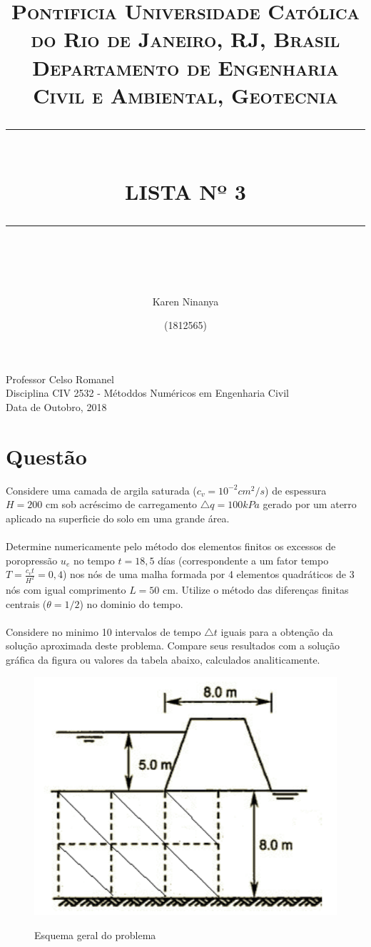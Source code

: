 \documentclass{article} %
\title{
	\normalfont \normalsize 
	\textsc{Pontificia Universidade Católica do Rio de Janeiro, RJ, Brasil \\ 
		Departamento de Engenharia Civil e Ambiental, Geotecnia} \\
	[10pt] 
	\rule{\linewidth}{0.5pt} \\[6pt] 
	\huge LISTA Nº 3\\
	\rule{\linewidth}{2pt}  \\[10pt]
}
\author{Karen Ninanya}
\date{\normalsize (1812565)}
\begin{document}
	
	\maketitle
	\noindent
	Professor \dotfill Celso Romanel\\
	Disciplina \dotfill CIV 2532 - Métoddos Numéricos em Engenharia Civil\\
	Data  de Outobro, 2018 \\
	
	\newpage
	\newpage


\section*{Questão}

\vspace{10mm}
Considere uma camada de argila saturada (\(c_v=10^{-2}cm^2/s\)) de espessura \(H=200\) cm sob acréscimo de carregamento \(\triangle q=100kPa\) gerado por um aterro aplicado na superficie do solo em uma grande área.\\
\\
Determine numericamente pelo método dos elementos finitos os excessos de poropressão \(u_e\) no tempo \(t=18,5 \) días (correspondente a um fator tempo \(T=\frac{c_vt}{H^2}=0,4\)) nos nós de uma malha formada por 4 elementos quadráticos de 3 nós com igual comprimento \(L=50\) cm. Utilize o método das diferenças finitas centrais (\(\theta=1/2\)) no dominio do tempo.\\
\\
Considere no minimo 10 intervalos de tempo \(\triangle t\) iguais para a obtenção da solução aproximada deste problema. Compare seus resultados com a solução gráfica da figura ou valores da tabela abaixo, calculados analiticamente.

\begin{figure}[H]
	\centering
	\caption{Esquema geral do problema}
	\includegraphics[width=0.65\linewidth]{principal}	
	\label{patton}	
\end{figure}
\end{document}
